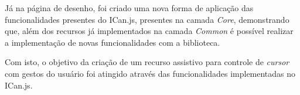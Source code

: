 
\par Já na página de desenho, foi criado uma nova forma de aplicação das funcionalidades presentes do ICan.js, presentes na camada \textit{Core}, demonstrando que, além dos recursos já implementados na camada \textit{Common} é possível realizar a implementação de novas funcionalidades com a biblioteca.


\par Com isto, o objetivo da criação de um recurso assistivo para controle de \textit{cursor} com gestos do usuário foi atingido através das funcionalidades implementadas no ICan.js.




